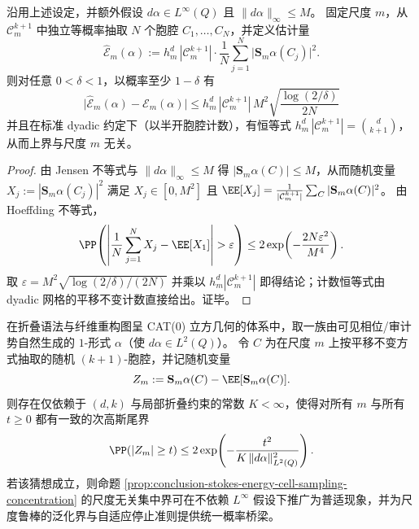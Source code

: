 \begin{proposition}[胞腔抽样下斯托克斯能量的尺度无关集中界]\label{prop:conclusion-stokes-energy-cell-sampling-concentration}
沿用上述设定，并额外假设 \(d\alpha\in L^\infty(Q)\) 且 \(\|d\alpha\|_\infty\le M\)。
固定尺度 \(m\)，从 \(\mathcal C_m^{k+1}\) 中独立等概率抽取 \(N\) 个胞腔 \(C_1,\dots,C_N\)，并定义估计量
\[
\widehat{\mathcal E}_m(\alpha)
:=
h_m^{d}\,|\mathcal C_m^{k+1}|\cdot \frac1N\sum_{j=1}^{N}\bigl|\mathbf S_m\alpha(C_j)\bigr|^2.
\]
则对任意 \(0<\delta<1\)，以概率至少 \(1-\delta\) 有
\[
\boxed{\;
\bigl|\widehat{\mathcal E}_m(\alpha)-\mathcal E_m(\alpha)\bigr|
\le
h_m^{d}\,|\mathcal C_m^{k+1}|\,M^2\sqrt{\frac{\log(2/\delta)}{2N}}\;}
\]
并且在标准 dyadic 约定下（以半开胞腔计数），有恒等式
\(
h_m^{d}\,|\mathcal C_m^{k+1}|=\binom{d}{k+1}
\)，
从而上界与尺度 \(m\) 无关。
\end{proposition}
\begin{proof}
由 Jensen 不等式与 \(\|d\alpha\|_\infty\le M\) 得
\(
|\mathbf S_m\alpha(C)|\le M
\)，从而随机变量
\(
X_j:=|\mathbf S_m\alpha(C_j)|^2
\)
满足 \(X_j\in[0,M^2]\) 且 \(\EE[X_j]=\frac1{|\mathcal C_m^{k+1}|}\sum_{C}|\mathbf S_m\alpha(C)|^2\)。
由 Hoeffding 不等式，
\[
\PP\!\left(\left|\frac1N\sum_{j=1}^N X_j-\EE[X_1]\right|>\varepsilon\right)
\le 2\exp\!\left(-\frac{2N\varepsilon^2}{M^4}\right).
\]
取 \(\varepsilon=M^2\sqrt{\log(2/\delta)/(2N)}\) 并乘以 \(h_m^{d}|\mathcal C_m^{k+1}|\) 即得结论；计数恒等式由 dyadic 网格的平移不变计数直接给出。证毕。
\end{proof}

\begin{conjecture}[折叠动力学诱导的斯托克斯胞腔平均的统一次高斯性]\label{conj:conclusion-stokes-energy-uniform-subgaussian}
在折叠语法与纤维重构图呈 CAT(0) 立方几何的体系中，取一族由可见相位/审计势自然生成的 \(1\)-形式 \(\alpha\)（使 \(d\alpha\in L^2(Q)\)）。
令 \(C\) 为在尺度 \(m\) 上按平移不变方式抽取的随机 \((k+1)\)-胞腔，并记随机变量
\[
Z_m:=\mathbf S_m\alpha(C)-\EE[\mathbf S_m\alpha(C)].
\]
则存在仅依赖于 \((d,k)\) 与局部折叠约束的常数 \(K<\infty\)，使得对所有 \(m\) 与所有 \(t\ge 0\) 都有一致的次高斯尾界
\[
\PP(|Z_m|\ge t)\le 2\exp\!\left(-\frac{t^2}{K\,\|d\alpha\|_{L^2(Q)}^2}\right).
\]
若该猜想成立，则命题 \ref{prop:conclusion-stokes-energy-cell-sampling-concentration} 的尺度无关集中界可在不依赖 \(L^\infty\) 假设下推广为普适现象，并为尺度鲁棒的泛化界与自适应停止准则提供统一概率桥梁。
\end{conjecture}

\endinput

